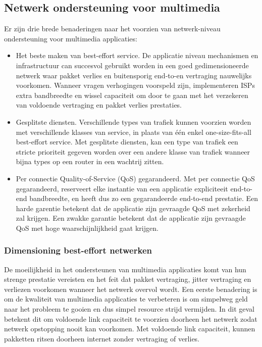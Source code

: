 \newpage
\subsection{Netwerk ondersteuning voor multimedia}

\noindent Er zijn drie brede benaderingen naar het voorzien van netwerk-niveau ondersteuning voor multimedia applicaties:
\begin{itemize}
    
\item	Het beste maken van best-effort service. De applicatie niveau mechanismen en infrastructuur can succesvol gebruikt worden in een goed gedimensioneerde netwerk waar pakket verlies en buitensporig end-to-en vertraging nauwelijks voorkomen. Wanneer vragen verhogingen voorspeld zijn, implementeren ISPs extra bandbreedte en wissel capaciteit om door te gaan met het verzekeren van voldoende vertraging en pakket verlies prestaties.
\item	Gesplitste diensten. Verschillende types van trafiek kunnen voorzien worden met verschillende klasses van service, in plaats van één enkel one-size-fits-all best-effort service. Met gesplitste diensten, kan een type van trafiek een stricte prioriteit gegeven worden over een andere klasse van trafiek wanneer bijna types op een router in een wachtrij zitten.
\item	Per connectie Quality-of-Service (QoS) gegarandeerd. Met per connectie QoS gegarandeerd, reserveert elke instantie van een applicatie expliciteeit end-to-end bandbreedte, en heeft dus zo een gegarandeerde end-to-end prestatie. Een harde garentie betekent dat de applicatie zijn gevraagde QoS met zekerheid zal krijgen. Een zwakke garantie betekent dat de applicatie zijn gevraagde QoS met hoge waarschijnlijkheid gaat krijgen.
\end{itemize}



\subsubsection{Dimensioning best-effort netwerken}

\noindent De moeilijkheid in het ondersteunen van multimedia applicaties komt van hun strenge prestatie vereisten en het feit dat pakket vertraging, jitter vertraging en verliezen voorkomen wanneer het netwerk overvol wordt. Een eerste benadering is om de kwaliteit van multimedia applicaties te verbeteren is om simpelweg geld naar het probleem te gooien en dus simpel resource strijd vermijden. In dit geval betekent dit om voldoende link capaciteit te voorzien doorheen het netwerk zodat netwerk opstopping nooit kan voorkomen. Met voldoende link capaciteit, kunnen pakketten ritsen doorheen internet zonder vertraging of verlies.

